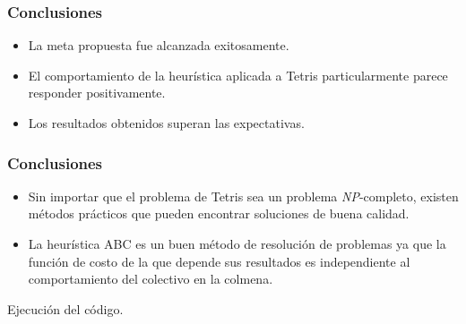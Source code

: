 \begin{frame}
\frametitle{Conclusiones}
\begin{itemize}
\pause
\item La meta propuesta fue alcanzada exitosamente.
\vspace{10mm}
\pause
\item El comportamiento de la heurística aplicada a Tetris particularmente parece responder positivamente.
\vspace{10mm}
\pause
\item Los resultados obtenidos superan las expectativas.
\end{itemize}
\end{frame}

\begin{frame}
\frametitle{Conclusiones}
\begin{itemize}
\item Sin importar que el problema de Tetris sea un problema \textsl{NP}-completo, existen métodos prácticos que pueden encontrar soluciones de buena calidad.
\vspace{10mm}
\pause
\item La heurística ABC es un buen método de resolución de problemas ya  
que la función de costo de la que depende sus resultados es independiente al 
comportamiento del colectivo en la colmena.
\end{itemize}
\end{frame}

\begin{frame}
\centering
Ejecución del código.
\end{frame}